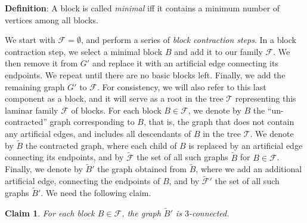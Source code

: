 \documentclass[twoside,leqno,twocolumn]{article}
\newcommand{\tset}{{\mathcal T}}
\newcommand{\fset}{{\mathcal{F}}}
\newtheorem{claim}{Claim}[section]
\newtheorem{claim}{Claim}
\newenvironment{Definition}{{\bf Definition}: }{}
\begin{document}
\begin{Definition}
A block is called \emph{minimal} iff it contains a minimum number of vertices among all blocks. 
\end{Definition}

We start with $\fset=\emptyset$, and perform a series of \emph{block contraction steps}.
In a block contraction step, we select a minimal 
block $B$ and add it to our family $\fset$. We then remove it from $G'$ and replace it with an artificial edge connecting its endpoints. We repeat until there are no basic blocks left. Finally, we add the remaining graph $G'$ to $\fset$. For consistency, we will also refer to this last component as a block, and it will serve as a root in the tree $\tset$ representing this laminar family $\fset$ of blocks.
For each block $B\in \fset$, we denote by $B$ the ``un-contracted'' graph corresponding to $B$, that is, the graph that does not contain any artificial edges, and includes all descendants of $B$ in the tree $\tset$. We denote by $\tilde{B}$ the contracted graph, where each child of $B$ is replaced by an artificial edge connecting its endpoints, and by $\tilde{\fset}$ the set of all such graphs $\tilde{B}$ for $B\in\fset$. Finally, we denote by $\tilde{B}'$ the graph obtained from $\tilde{B}$, where we add an additional artificial edge, connecting the endpoints of $B$, and by $\tilde{\fset}'$ the set of all such graphs $\tilde{B}'$. We need the following claim.

\begin{claim}\label{claim:decomposition1}
For each block $B\in \fset$, the graph $\tilde{B}'$ is $3$-connected.
\end{claim}
\end{document}
